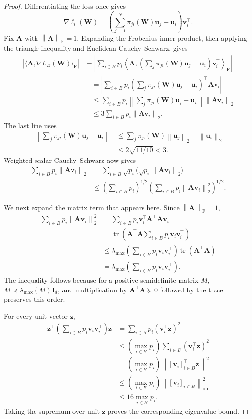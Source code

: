 \documentclass[11pt]{article}
\theoremstyle{definition}
\newcommand{\ub}{\mathbf{u}}
\newcommand{\vb}{\mathbf{v}}
\newcommand{\zb}{\mathbf{z}}
\newcommand{\Ab}{\mathbf{A}}
\newcommand{\Ib}{\mathbf{I}}
\newcommand{\Wb}{\mathbf{W}}
\newcommand{\norm}[1]{\left\lVert #1\right\rVert_2}
\newcommand{\normF}[1]{\left\lVert #1\right\rVert_{\mathrm F}}
\newcommand{\normop}[1]{\left\lVert #1\right\rVert_{\mathrm{op}}}
\begin{document}
\begin{proof}
Differentiating the loss once gives
\[
 \nabla\ell_i(\Wb)
 =\left(\sum_{j=1}^N\pi_{ji}(\Wb)\ub_j-\ub_i\right)\vb_i^\top.
\]
Fix $\Ab$ with $\normF{\Ab}=1$.  Expanding the Frobenius inner product,
then applying the triangle inequality and Euclidean Cauchy--Schwarz, gives
\begin{align*}
 |\langle\Ab,\nabla L_B(\Wb)\rangle_{\mathrm F}|&=
 \left|
  \sum_{i\in B}p_i
  \left\langle
   \Ab,
   \left(\sum_j\pi_{ji}(\Wb)\ub_j-\ub_i\right)\vb_i^\top
  \right\rangle_{\mathrm F}
 \right|\\
 &\quad=
 \left|
  \sum_{i\in B}p_i
  \left(\sum_j\pi_{ji}(\Wb)\ub_j-\ub_i\right)^\top
  \Ab\vb_i
 \right|\\
 &\quad\leq
 \sum_{i\in B}p_i
 \left\|\sum_j\pi_{ji}(\Wb)\ub_j-\ub_i\right\|
 \norm{\Ab\vb_i}\\
 &\quad\leq3\sum_{i\in B}p_i\norm{\Ab\vb_i}.
\end{align*}
The last line uses
\begin{align*}
 \left\|\sum_j\pi_{ji}(\Wb)\ub_j-\ub_i\right\|
 &\leq\sum_j\pi_{ji}(\Wb)\norm{\ub_j}+\norm{\ub_i}\\
 &\leq2\sqrt{11/10}<3.
\end{align*}
Weighted scalar Cauchy--Schwarz now gives
\begin{align*}
 \sum_{i\in B}p_i\norm{\Ab\vb_i}
 &=\sum_{i\in B}\sqrt{p_i}
 \bigl(\sqrt{p_i}\norm{\Ab\vb_i}\bigr)\\
 &\leq
 \left(\sum_{i\in B}p_i\right)^{1/2}
 \left(\sum_{i\in B}p_i\norm{\Ab\vb_i}^2\right)^{1/2}.
\end{align*}

We next expand the matrix term that appears here.  Since
$\normF{\Ab}=1$,
\begin{align*}
 \sum_{i\in B}p_i\norm{\Ab\vb_i}^2
 &=\sum_{i\in B}p_i\vb_i^\top\Ab^\top\Ab\vb_i\\
 &=\operatorname{tr}\!\left(
  \Ab^\top\Ab\sum_{i\in B}p_i\vb_i\vb_i^\top
 \right)\\
 &\leq
 \lambda_{\max}\!\left(\sum_{i\in B}p_i\vb_i\vb_i^\top\right)
 \operatorname{tr}(\Ab^\top\Ab)\\
 &=\lambda_{\max}\!\left(\sum_{i\in B}p_i\vb_i\vb_i^\top\right).
\end{align*}
The inequality follows because for a positive-semidefinite matrix $M$,
$M\preceq\lambda_{\max}(M)\Ib_d$, and multiplication by
$\Ab^\top\Ab\succeq0$ followed by the trace preserves this order.

For every unit vector $\zb$,
\begin{align*}
 \zb^\top\left(\sum_{i\in B}p_i\vb_i\vb_i^\top\right)\zb
 &=\sum_{i\in B}p_i(\vb_i^\top\zb)^2\\
 &\leq\left(\max_{i\in B}p_i\right)
 \sum_{i\in B}(\vb_i^\top\zb)^2\\
 &=\left(\max_{i\in B}p_i\right)
 \left\|[\vb_i]_{i\in B}^\top\zb\right\|^2\\
 &\leq\left(\max_{i\in B}p_i\right)
 \normop{[\vb_i]_{i\in B}}^2\\
 &\leq16\max_{i\in B}p_i.
\end{align*}
Taking the supremum over unit $\zb$ proves the corresponding eigenvalue
bound.


\end{proof}
\end{document}
